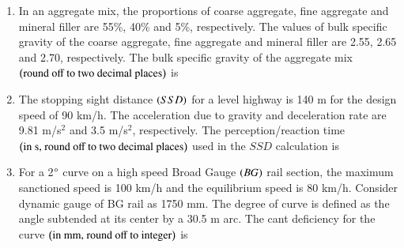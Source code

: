 \documentclass[journal,12pt,onecolumn]{article}
\theoremstyle{remark}
\begin{document}
\begin{enumerate}
\hfill{}

\item In an aggregate mix, the proportions of coarse aggregate, fine aggregate and mineral filler are 55\%, 40\% and 5\%, respectively. The values of bulk specific gravity of the coarse aggregate, fine aggregate and mineral filler are 2.55, 2.65 and 2.70, respectively. The bulk specific gravity of the aggregate mix $\left(\text{round off to two decimal places}\right)$ is \underline{\hspace{2cm}}

\hfill{}

\item The stopping sight distance $\left(SSD\right)$ for a level highway is 140 m for the design speed of 90 km/h. The acceleration due to gravity and deceleration rate are 9.81 m/s$^2$ and 3.5 m/s$^2$, respectively. The perception/reaction time $\left(\text{in s, round off to two decimal places}\right)$ used in the $SSD$ calculation is \underline{\hspace{2cm}}

\hfill{}

\item For a 2$\degree$ curve on a high speed Broad Gauge $\left(BG\right)$ rail section, the maximum sanctioned speed is 100 km/h and the equilibrium speed is 80 km/h. Consider dynamic gauge of BG rail as 1750 mm. The degree of curve is defined as the angle subtended at its center by a 30.5 m arc. The cant deficiency for the curve $\left(\text{in mm, round off to integer}\right)$ is \underline{\hspace{2cm}}

\hfill{}

\end{enumerate}
\end{document}
